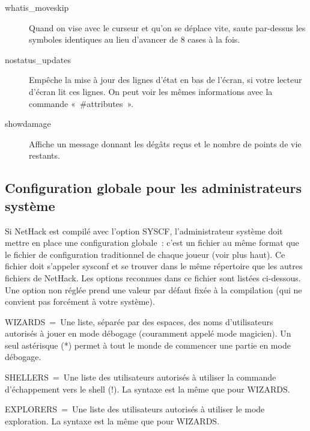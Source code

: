 \documentclass[titlepage]{article}
\begin{document}
\begin{description}
\item[{whatis\_moveskip}]
Quand on vise avec le curseur et qu'on se déplace vite, saute par-dessus
les symboles identiques au lieu d'avancer de 8 cases à la fois.

\item[{nostatus\_updates}]
Empêche la mise à jour des lignes d'état en bas de l'écran, si votre
lecteur d'écran lit ces lignes.
On peut voir les mêmes informations avec la commande
«~\#attributes~».

\item[{showdamage}]
Affiche un message donnant les dégâts reçus et le nombre de points de vie
restants.

\end{description}
\subsection{Configuration globale pour les administrateurs système}



Si NetHack est compilé avec l'option SYSCF, l'administrateur système doit
mettre en place une configuration globale~: c'est un fichier au même
format que le fichier de configuration traditionnel de chaque joueur (voir
plus haut).
Ce fichier doit s'appeler sysconf et se trouver dans le même répertoire
que les autres fichiers de NetHack.
Les options reconnues dans ce fichier sont listées ci-dessous.
Une option non réglée prend une valeur par défaut fixée à la compilation
(qui ne convient pas forcément à votre système).




WIZARDS~=~Une liste, séparée par des espaces, des noms d'utilisateurs
autorisés à jouer en mode débogage (couramment appelé mode magicien).
Un seul astérisque (*) permet à tout le monde de commencer une partie en
mode débogage.


SHELLERS~=~Une liste des utilisateurs autorisés à utiliser la commande
d'échappement vers le shell (!).
La syntaxe est la même que pour WIZARDS.


EXPLORERS~=~Une liste des utilisateurs autorisés à utiliser le mode
exploration.
La syntaxe est la même que pour WIZARDS.
\end{document}
